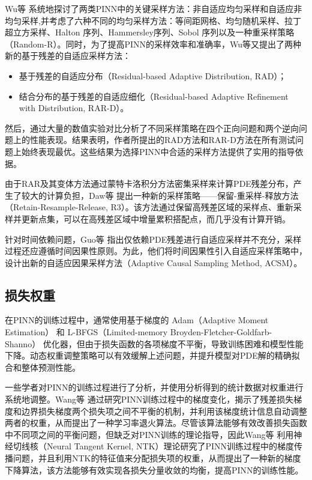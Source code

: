 Wu等 \cite{wu2023comprehensive}系统地探讨了两类PINN中的关键采样方法：非自适应均匀采样和自适应非均匀采样,并考虑了六种不同的均匀采样方法：等间距网格、均匀随机采样、拉丁超立方采样、Halton 序列、Hammersley序列、Sobol 序列以及一种重采样策略（Random-R）。同时，为了提高PINN的采样效率和准确率，Wu等又提出了两种新的基于残差的自适应采样方法：
\begin{itemize}
    \item 基于残差的自适应分布（Residual-based Adaptive Distribution, RAD）；
    \item 结合分布的基于残差的自适应细化（Residual-based Adaptive Refinement with Distribution, RAR-D）。
\end{itemize}
然后，通过大量的数值实验对比分析了不同采样策略在四个正向问题和两个逆向问题上的性能表现。结果表明，作者所提出的RAD方法和RAR-D方法在所有测试问题上始终表现最优。这些结果为选择PINN中合适的采样方法提供了实用的指导依据。

由于RAR及其变体方法通过蒙特卡洛积分方法密集采样来计算PDE残差分布，产生了较大的计算负担，Daw等 \cite{daw2022mitigating}提出一种新的采样策略——保留-重采样-释放方法（Retain-Resample-Release, R3）。该方法通过保留高残差区域的采样点、重新采样并更新点集，可以在高残差区域中增量累积搭配点，而几乎没有计算开销。

针对时间依赖问题，Guo等 \cite{guo2022novel}指出仅依赖PDE残差进行自适应采样并不充分，采样过程还应遵循时间因果性原则。为此，他们将时间因果性引入自适应采样策略中，设计出新的自适应因果采样方法（Adaptive Causal Sampling Method, ACSM）。        

\subsection{损失权重}

在PINN的训练过程中，通常使用基于梯度的 Adam（Adaptive Moment Estimation） \cite{kingma2014adam}和 L-BFGS（Limited-memory Broyden-Fletcher-Goldfarb-Shanno） \cite{liu1989limited}优化器，但由于损失函数的各项梯度不平衡，导致训练困难和模型性能下降。动态权重调整策略可以有效缓解上述问题，并提升模型对PDE解的精确拟合和整体预测性能。

一些学者对PINN的训练过程进行了分析，并使用分析得到的统计数据对权重进行系统地调整。Wang等 \cite{wang2021understanding}通过研究PINN训练过程中的梯度变化，揭示了残差损失梯度和边界损失梯度两个损失项之间不平衡的机制，并利用该梯度统计信息自动调整两者的权重，从而提出了一种学习率退火算法。尽管该算法能够有效改善损失函数中不同项之间的平衡问题，但缺乏对PINN训练的理论指导，因此Wang等 \cite{wang2022and}利用神经切线核（Neural Tangent Kernel, NTK）理论研究了PINN训练过程中的梯度传播问题，并且利用NTK的特征值来分配损失项的权重，从而提出了一种新的梯度下降算法，该方法能够有效实现各损失分量收敛的均衡，提高PINN的训练性能。

